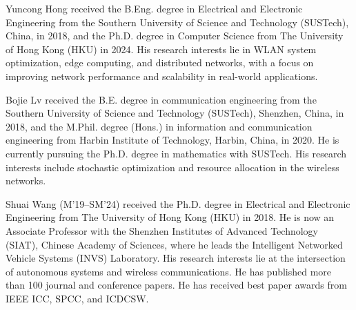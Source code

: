 
\vspace{-0.3cm}
\begin{IEEEbiography}{Yuncong Hong}
    received the B.Eng. degree in Electrical and Electronic Engineering from the Southern University of Science and Technology (SUSTech), China, in 2018, and the Ph.D. degree in Computer Science from The University of Hong Kong (HKU) in 2024. His research interests lie in WLAN system optimization, edge computing, and distributed networks, with a focus on improving network performance and scalability in real-world applications.
\end{IEEEbiography}
\vspace{-1cm}

\begin{IEEEbiography}{Bojie Lv}
    received the B.E. degree in communication engineering from the Southern University of Science and Technology (SUSTech), Shenzhen, China, in 2018, and the M.Phil. degree (Hons.) in information and communication engineering from Harbin Institute of Technology, Harbin, China, in 2020. He is currently pursuing the Ph.D. degree in mathematics with SUSTech. His research interests include stochastic optimization and resource allocation in the wireless networks.
\end{IEEEbiography}
\vspace{-1cm}

\begin{IEEEbiography}
{Shuai Wang} (M'19--SM’24)
received the Ph.D. degree in Electrical and Electronic Engineering from The University of Hong Kong (HKU) in 2018. He is now an Associate Professor with the Shenzhen Institutes of Advanced Technology (SIAT), Chinese Academy of Sciences, where he leads the Intelligent Networked Vehicle Systems (INVS) Laboratory. His research interests lie at the intersection of autonomous systems and wireless communications. He has published more than 100 journal and conference papers. He has received best paper awards from IEEE ICC, SPCC, and ICDCSW.
\end{IEEEbiography}
\vspace{-1cm}

